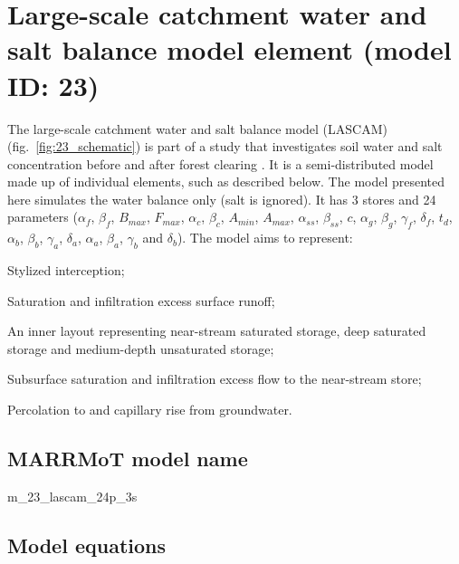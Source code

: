 \section{Large-scale catchment water and salt balance model element (model ID: 23)}
The large-scale catchment water and salt balance model (LASCAM) (fig.~\ref{fig:23_schematic}) is part of a study that investigates soil water and salt concentration before and after forest clearing \citep{Sivapalan1996a}. It is a semi-distributed model made up of individual elements, such as described below. The model presented here simulates the water balance only (salt is ignored). It has 3 stores and 24 parameters ($\alpha_f$, $\beta_f$, $B_{max}$,  $F_{max}$, $\alpha_c$, $\beta_c$, $A_{min}$, $A_{max}$, $\alpha_{ss}$, $\beta_{ss}$, $c$, $\alpha_g$, $\beta_g$, $\gamma_f$, $\delta_f$, $t_d$, $\alpha_b$, $\beta_b$, $\gamma_a$, $\delta_a$, $\alpha_a$, $\beta_a$, $\gamma_b$ and $\delta_b$). The model aims to represent:

\begin{itemizecompact}
\item Stylized interception;
\item Saturation and infiltration excess surface runoff;
\item An inner layout representing near-stream saturated storage, deep saturated storage and medium-depth unsaturated storage;
\item Subsurface saturation and infiltration excess flow to the near-stream store;
\item Percolation to and capillary rise from groundwater.
\end{itemizecompact}

\subsection{MARRMoT model name}
m\_23\_lascam\_24p\_3s \\

\subsection{Model equations}

